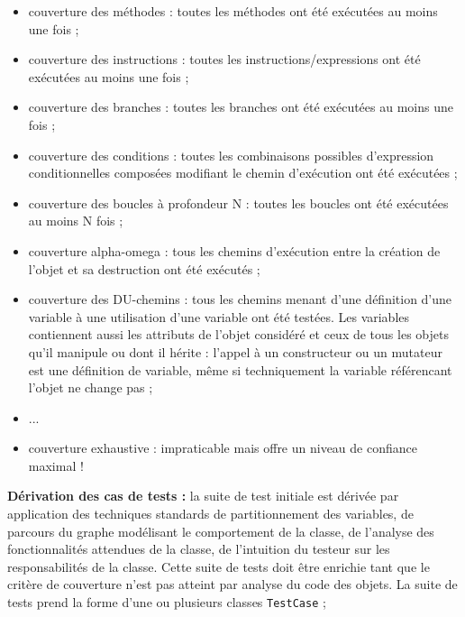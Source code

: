 \begin{itemize}
       
\item couverture des m\'ethodes : toutes les m\'ethodes
      ont \'et\'e ex\'ecut\'ees au moins une fois ; 
\item couverture des instructions : toutes les
      instructions/expressions ont \'et\'e ex\'ecut\'ees au moins
      une fois ; 
\item couverture des branches : toutes les branches ont
      \'et\'e ex\'ecut\'ees au moins une fois ; 
\item couverture des conditions : toutes les combinaisons
      possibles d'expression conditionnelles compos\'ees modifiant le
      chemin d'ex\'ecution ont \'et\'e ex\'ecut\'ees ; 
\item couverture des boucles \`a profondeur N : toutes les
      boucles ont \'et\'e ex\'ecut\'ees au moins N fois  ; 
\item couverture alpha-omega : tous les chemins d'ex\'ecution
      entre la cr\'eation de l'objet et sa destruction ont \'et\'e
       ex\'ecut\'es ; 
\item couverture des DU-chemins : tous
      les chemins menant d'une d\'efinition d'une variable \`a une
      utilisation d'une variable ont \'et\'e test\'ees. Les
      variables contiennent aussi les attributs de l'objet
      consid\'er\'e et ceux de tous les objets qu'il  manipule ou
      dont il h\'erite : l'appel \`a un constructeur ou un mutateur
      est une d\'efinition de variable, m\^eme si techniquement la
      variable r\'ef\'erencant l'objet ne change pas ; 
\item ... 
\item couverture exhaustive : impraticable mais offre un niveau
      de confiance maximal !
\end{itemize}
  
\par
  
\textbf{D\'erivation des cas de tests :}
   la suite de test
      initiale est d\'eriv\'ee par application des techniques
      standards de partitionnement des variables, de parcours du
      graphe mod\'elisant le comportement de la classe, de
      l'analyse des fonctionnalit\'es attendues de la classe, de
      l'intuition du testeur sur les responsabilit\'es de la
      classe. Cette suite de tests doit \^etre enrichie tant que le
      crit\`ere de couverture n'est pas atteint par analyse du code
      des objets. La suite de tests prend la forme d'une ou plusieurs
      classes 
\texttt{TestCase}
    ;
\par
  
